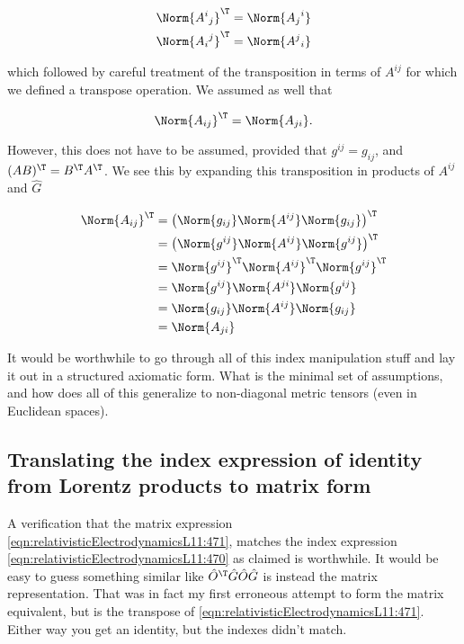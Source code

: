 \begin{align}\label{eqn:relativisticElectrodynamicsL11:1022}
\Norm{ {A^{i}}_j }^\T &= \Norm{ {A_{j}}^i } \\
\Norm{ {A_{i}}^j }^\T &= \Norm{ {A^{j}}_i } 
\end{align}

which followed by careful treatment of the transposition in terms of $A^{i j}$ for which we defined a transpose operation.  We assumed as well that

\begin{equation}\label{eqn:relativisticElectrodynamicsL11:1042}
\Norm{ A_{i j} }^\T = \Norm{ A_{j i} }.
\end{equation}

However, this does not have to be assumed, provided that $g^{i j} = g_{i j}$, and $(AB)^\T = B^\T A^\T$.  We see this by expanding this transposition in products of $A^{i j}$ and $\hat{G}$

\begin{align*}
\Norm{ A_{i j} }^\T
&= \left( \Norm{g_{i j}} \Norm{ A^{i j} } \Norm{g_{i j}} \right)^\T \\
&= \left( \Norm{g^{i j}} \Norm{ A^{i j} } \Norm{g^{i j}} \right)^\T \\
&= \Norm{g^{i j}}^\T \Norm{ A^{i j}}^\T \Norm{g^{i j}}^\T \\
&= \Norm{g^{i j}} \Norm{ A^{j i}} \Norm{g^{i j}} \\
&= \Norm{g_{i j}} \Norm{ A^{i j}} \Norm{g_{i j}} \\
&= \Norm{ A_{j i}} 
\end{align*}

It would be worthwhile to go through all of this index manipulation stuff and lay it out in a structured axiomatic form.  What is the minimal set of assumptions, and how does all of this generalize to non-diagonal metric tensors (even in Euclidean spaces).

\subsection{Translating the index expression of identity from Lorentz products to matrix form}

A verification that the matrix expression \ref{eqn:relativisticElectrodynamicsL11:471}, matches the index expression \ref{eqn:relativisticElectrodynamicsL11:470} as claimed is worthwhile.  It would be easy to guess something similar like $\hat{O}^\T \hat{G} \hat{O} \hat{G}$ is instead the matrix representation.  That was in fact my first erroneous attempt to form the matrix equivalent, but is the transpose of \ref{eqn:relativisticElectrodynamicsL11:471}.  Either way you get an identity, but the indexes didn't match.

